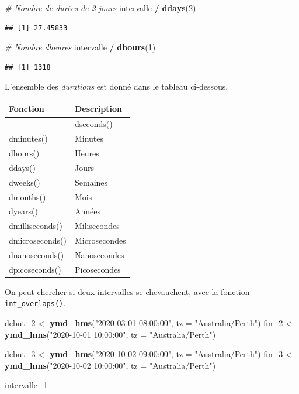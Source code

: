 \documentclass[
  11pt,
]{book}
\newenvironment{Shaded}{\begin{snugshade}}{\end{snugshade}}
\newcommand{\CommentTok}[1]{\textcolor[rgb]{0.56,0.35,0.01}{\textit{#1}}}
\newcommand{\DataTypeTok}[1]{\textcolor[rgb]{0.13,0.29,0.53}{#1}}
\newcommand{\DecValTok}[1]{\textcolor[rgb]{0.00,0.00,0.81}{#1}}
\newcommand{\KeywordTok}[1]{\textcolor[rgb]{0.13,0.29,0.53}{\textbf{#1}}}
\newcommand{\NormalTok}[1]{#1}
\newcommand{\OperatorTok}[1]{\textcolor[rgb]{0.81,0.36,0.00}{\textbf{#1}}}
\newcommand{\StringTok}[1]{\textcolor[rgb]{0.31,0.60,0.02}{#1}}
\numberwithin{equation}{section}
\numberwithin{countremarque}{section}
\begin{document}
\begin{Shaded}
\begin{Highlighting}[]
\CommentTok{\# Nombre de durées de 2 jours}
\NormalTok{intervalle }\OperatorTok{/}\StringTok{ }\KeywordTok{ddays}\NormalTok{(}\DecValTok{2}\NormalTok{)}
\end{Highlighting}
\end{Shaded}

\begin{lstlisting}
## [1] 27.45833
\end{lstlisting}

\begin{Shaded}
\begin{Highlighting}[]
\CommentTok{\# Nombre d\textquotesingle{}heures}
\NormalTok{intervalle }\OperatorTok{/}\StringTok{ }\KeywordTok{dhours}\NormalTok{(}\DecValTok{1}\NormalTok{)}
\end{Highlighting}
\end{Shaded}

\begin{lstlisting}
## [1] 1318
\end{lstlisting}

L'ensemble des \emph{durations} est donné dans le tableau ci-dessous.

\begin{longtable}[]{@{}ll@{}}
\toprule
Fonction & Description\tabularnewline
\midrule
\endhead
& dseconds()\tabularnewline
dminutes() & Minutes\tabularnewline
dhours() & Heures\tabularnewline
ddays() & Jours\tabularnewline
dweeks() & Semaines\tabularnewline
dmonths() & Mois\tabularnewline
dyears() & Années\tabularnewline
dmilliseconds() & Milisecondes\tabularnewline
dmicroseconds() & Microsecondes\tabularnewline
dnanoseconds() & Nanosecondes\tabularnewline
dpicoseconds() & Picosecondes\tabularnewline
\bottomrule
\end{longtable}

On peut chercher si deux intervalles se chevauchent, avec la fonction \texttt{int\_overlaps()}.

\begin{Shaded}
\begin{Highlighting}[]
\NormalTok{debut\_}\DecValTok{2}\NormalTok{ \textless{}{-}}\StringTok{ }\KeywordTok{ymd\_hms}\NormalTok{(}\StringTok{"2020{-}03{-}01 08:00:00"}\NormalTok{, }\DataTypeTok{tz =} \StringTok{"Australia/Perth"}\NormalTok{)}
\NormalTok{fin\_}\DecValTok{2}\NormalTok{ \textless{}{-}}\StringTok{ }\KeywordTok{ymd\_hms}\NormalTok{(}\StringTok{"2020{-}10{-}01 10:00:00"}\NormalTok{, }\DataTypeTok{tz =} \StringTok{"Australia/Perth"}\NormalTok{)}

\NormalTok{debut\_}\DecValTok{3}\NormalTok{ \textless{}{-}}\StringTok{ }\KeywordTok{ymd\_hms}\NormalTok{(}\StringTok{"2020{-}10{-}02 09:00:00"}\NormalTok{, }\DataTypeTok{tz =} \StringTok{"Australia/Perth"}\NormalTok{)}
\NormalTok{fin\_}\DecValTok{3}\NormalTok{ \textless{}{-}}\StringTok{ }\KeywordTok{ymd\_hms}\NormalTok{(}\StringTok{"2020{-}10{-}02 10:00:00"}\NormalTok{, }\DataTypeTok{tz =} \StringTok{"Australia/Perth"}\NormalTok{)}

\NormalTok{intervalle\_}\DecValTok{1}
\end{Highlighting}
\end{Shaded}
\end{document}
